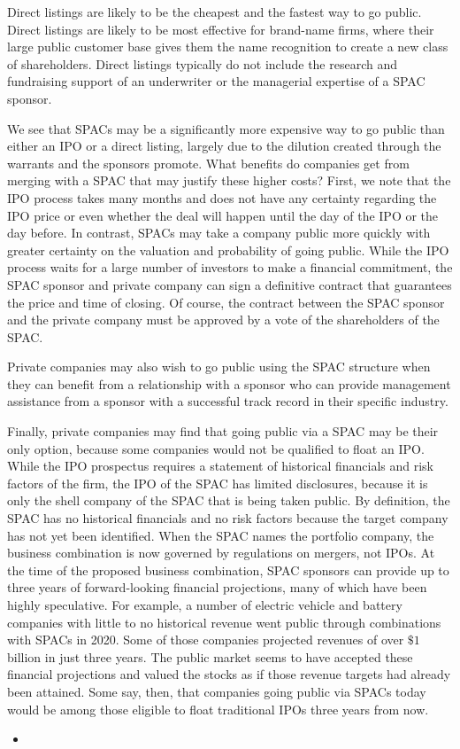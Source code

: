 \documentclass[11pt]{article}
\begin{document}
Direct listings are likely to be the cheapest and the fastest way to go public. Direct listings are likely to be most effective for brand-name firms, where their large public customer base gives them the name recognition to create a new class of shareholders. Direct listings typically do not include the research and fundraising support of an underwriter or the managerial expertise of a SPAC sponsor.

We see that SPACs may be a significantly more expensive way to go public than either an IPO or a direct listing, largely due to the dilution created through the warrants and the sponsors promote. What benefits do companies get from merging with a SPAC that may justify these higher costs? First, we note that the IPO process takes many months and does not have any certainty regarding the IPO price or even whether the deal will happen until the day of the IPO or the day before. In contrast, SPACs may take a company public more quickly with greater certainty on the valuation and probability of going public. While the IPO process waits for a large number of investors to make a financial commitment, the SPAC sponsor and private company can sign a definitive contract that guarantees the price and time of closing. Of course, the contract between the SPAC sponsor and the private company must be approved by a vote of the shareholders of the SPAC.

Private companies may also wish to go public using the SPAC structure when they can benefit from a relationship with a sponsor who can provide management assistance from a sponsor with a successful track record in their specific industry.

Finally, private companies may find that going public via a SPAC may be their only option, because some companies would not be qualified to float an IPO. While the IPO prospectus requires a statement of historical financials and risk factors of the firm, the IPO of the SPAC has limited disclosures, because it is only the shell company of the SPAC that is being taken public. By definition, the SPAC has no historical financials and no risk factors because the target company has not yet been identified. When the SPAC names the portfolio company, the business combination is now governed by regulations on mergers, not IPOs. At the time of the proposed business combination, SPAC sponsors can provide up to three years of forward-looking financial projections, many of which have been highly speculative. For example, a number of electric vehicle and battery companies with little to no historical revenue went public through combinations with SPACs in 2020. Some of those companies projected revenues of over $\$ 1$ billion in just three years. The public market seems to have accepted these financial projections and valued the stocks as if those revenue targets had already been attained. Some say, then, that companies going public via SPACs today would be among those eligible to float traditional IPOs three years from now.

\begin{itemize}
  \item 
\end{itemize}
\end{document}
